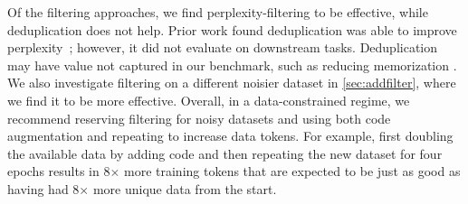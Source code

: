 \documentclass{article}
\begin{document}
Of the filtering approaches, we find perplexity-filtering to be effective, while deduplication does not help. Prior work found deduplication was able to improve perplexity~\cite{deduplicatinglee2021}; however, it did not evaluate on downstream tasks. Deduplication may have value not captured in our benchmark, such as reducing memorization \cite{kandpal2022deduplicating,hernandez2022scaling,carlini2022quantifying,biderman2023emergent}. We also investigate filtering on a different noisier dataset in \autoref{sec:addfilter}, where we find it to be more effective. Overall, in a data-constrained regime, we recommend reserving filtering for noisy datasets and using both code augmentation and repeating to increase data tokens. For example, first doubling the available data by adding code and then repeating the new dataset for four epochs results in 8$\times$ more training tokens that are expected to be just as good as having had 8$\times$ more unique data from the start. 


\end{document}
